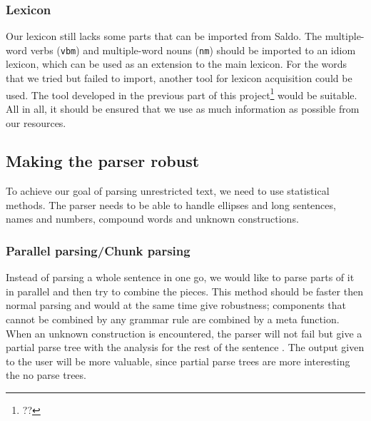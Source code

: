 \documentclass{report}
\begin{document}
\subsubsection{Lexicon}
Our lexicon still lacks some parts that can be imported from Saldo.
The multiple-word verbs (\verb-vbm-) and multiple-word nouns (\verb-nm-) should
be imported to an idiom lexicon, which can be used as an extension to the main
lexicon.
For the words that we tried but failed to import, another tool for lexicon
acquisition could be used. The tool developed in the previous part of
this project\footnote{??} would be suitable.
All in all, it should be ensured that we use as much information as
possible from our resources.


\subsection{Making the parser robust}
To achieve our goal of parsing unrestricted text, we need to use statistical methods.
The parser needs to be able to handle
ellipses and long sentences, names and numbers,
compound words and unknown constructions.

\subsubsection{Parallel parsing/Chunk parsing}
Instead of parsing a whole sentence in one go, we would like to
parse parts of it in parallel and then try to combine the pieces.
This method should be faster then normal parsing and would
at the same time give robustness;
components that cannot be combined by any grammar rule are combined by a 
meta function. When an unknown construction is encountered, the parser
will not fail but give a partial parse tree with the analysis for the rest of
the sentence \cite{gfMech}.
The output given to the user will be more valuable, since partial parse
trees are more interesting the no parse trees.
\end{document}
